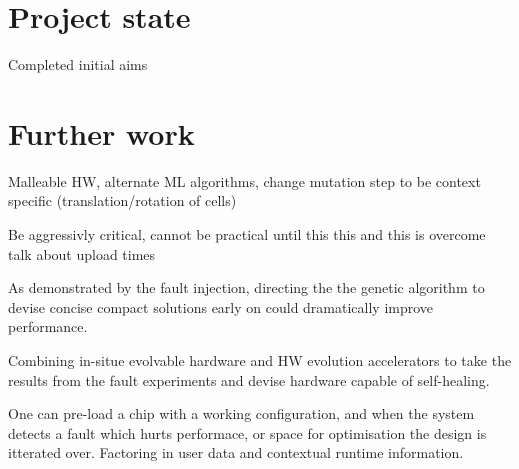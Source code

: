 \section{Project state}
Completed initial aims

\section{Further work}
Malleable HW, alternate ML algorithms, change mutation step to be context specific (translation/rotation
of cells)

Be aggressivly critical, cannot be practical until this this and this is overcome
talk about upload times

As demonstrated by the fault injection, directing the the genetic algorithm
to devise concise compact solutions early on could dramatically improve performance.

Combining in-situe evolvable hardware and HW evolution accelerators
to take the results from the fault experiments and devise hardware
capable of self-healing.

One can pre-load a chip with a working configuration, and when the system detects a fault which hurts performace, or space for optimisation the design is itterated over. Factoring in user data and contextual runtime information.

